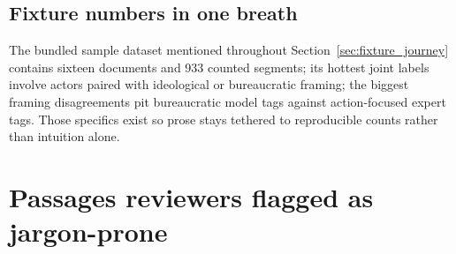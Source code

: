 \documentclass[11pt,a4paper]{article}
\theoremstyle{remark}
\begin{document}
\subsection{Fixture numbers in one breath}
The bundled sample dataset mentioned throughout Section~\ref{sec:fixture_journey} contains sixteen documents and 933 counted segments; its hottest joint labels involve actors paired with ideological or bureaucratic framing; the biggest framing disagreements pit bureaucratic model tags against action-focused expert tags. Those specifics exist so prose stays tethered to reproducible counts rather than intuition alone.

\section{Passages reviewers flagged as jargon-prone}
\label{app:jargon_list}
\end{document}
